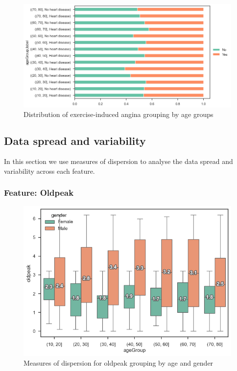 \begin{figure}
    \caption{Distribution of exercise-induced angina grouping by age groups}\label{frequency-exerciseangina-agegroup-percent}
    \centering
    \includegraphics[width=\linewidth]{media/frequency-12-agegroup-exerciseangina.png}
\end{figure}

\subsection{Data spread and variability}

In this section we use measures of dispersion to analyse the data spread and variability across each feature.

\subsubsection{Feature: Oldpeak}

\begin{figure}
    \caption{Measures of dispersion for oldpeak grouping by age and gender}\label{boxplot-oldpeak-age}
    \centering
    \includegraphics[width=\linewidth]{media/boxplot-01-agegroup-gender-oldpeak.png}
\end{figure}

